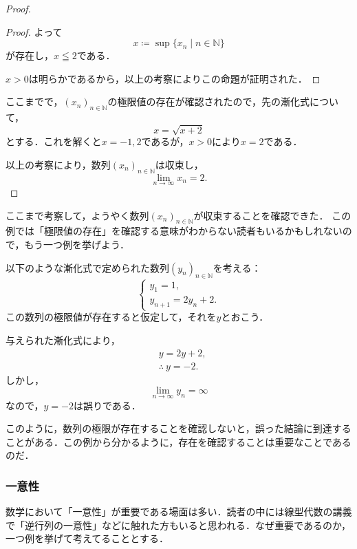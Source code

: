 \documentclass[a4paper,11pt]{ltjsarticle}
\newenvironment{tleftbar}{\begin{tbleftline}\setlength{\parindent}{1\zw}}{\end{tbleftline}}
\newenvironment{dotleftbar}{%
  \begin{tbdotleftline}\setlength{\parindent}{1\zw}%
}{%
  \end{tbdotleftline}%
}
\begin{document}
\begin{tleftbar}
\begin{proof}
\begin{dotleftbar}
\begin{proof}
        よって
        \[
          x \coloneqq \sup \{ x_n \mid n \in \mathbb{N} \}
        \]
        が存在し，$x \leqq  2$である．

        $ x>0$は明らかであるから，以上の考察によりこの命題が証明された．
      \end{proof}
    \end{dotleftbar}

    ここまでで，$(x_n)_{n \in \mathbb{N}}$の極限値の存在が確認されたので，先の漸化式について，
    \[
      x=\sqrt{x+2}
    \]
    とする．これを解くと$ x= -1,2$であるが，$x>0$により$x=2$である．

    以上の考察により，数列$(x_n)_{n \in \mathbb{N}}$は収束し，
    \[
      \lim_{n \to \infty} x_n =2.
    \]
  \end{proof}
\end{tleftbar}

ここまで考察して，ようやく数列$(x_n)_{n \in \mathbb{N}}$が収束することを確認できた．
この例では「極限値の存在」を確認する意味がわからない読者もいるかもしれないので，もう一つ例を挙げよう．


以下のような漸化式で定められた数列$(y_n)_{n \in \mathbb{N}}$を考える：
\[
  \begin{cases}
    y_1 =1 , \\
    y_{n+1}= 2y_n +2.
  \end{cases}
\]
この数列の極限値が存在すると仮定して，それを$y$とおこう．
\begin{tleftbar}
  与えられた漸化式により，
  \begin{align*}
     & y = 2y +2,           \\
     & \therefore ~ y = -2.
  \end{align*}
  しかし，
  \[
    \lim_{n \to \infty} y_n = \infty
  \]
  なので，$y=-2$は誤りである．
\end{tleftbar}

このように，数列の極限が存在することを確認しないと，誤った結論に到達することがある．この例から分かるように，存在を確認することは重要なことであるのだ．


\subsubsection{一意性}

数学において「一意性」が重要である場面は多い．読者の中には線型代数の講義で「逆行列の一意性」などに触れた方もいると思われる．なぜ重要であるのか，一つ例を挙げて考えてることとする．
\end{document}
